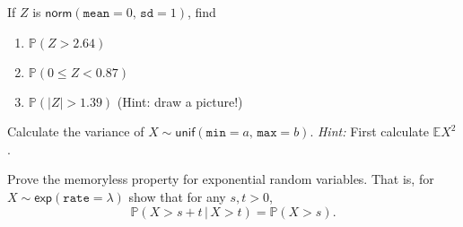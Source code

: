 \begin{xca}
If \(Z\) is \(\mathsf{norm}(\mathtt{mean} = 0,\,\mathtt{sd} = 1)\), find 
\begin{enumerate}
\item \(\mathbb{P}(Z > 2.64)\)
\item \(\mathbb{P}(0 \leq Z < 0.87)\)
\item \(\mathbb{P}(|Z| > 1.39)\) (Hint: draw a picture!)
\end{enumerate}
\end{xca}

\begin{xca}
\label{xca-variance-dunif} Calculate the variance of
\(X\sim\mathsf{unif}(\mathtt{min}=a,\,\mathtt{max}=b)\). \emph{Hint:} First
calculate \(\mathbb{E} X^{2}\).
\end{xca}

\begin{xca}
\label{xca-prove-the-memoryless} Prove the memoryless property for
exponential random variables. That is, for \(X \sim
\mathsf{exp}(\mathtt{rate} = \lambda)\) show that for any \(s,t > 0\),
\[ \mathbb{P}(X > s + t\,|\, X > t) = \mathbb{P}(X > s).  \]
\end{xca}
